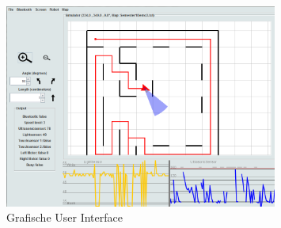 \documentclass[eind]{penoverslag}
\begin{document}
\begin{figure}[tbp]
\begin{center}
    \includegraphics[width=0.8\textwidth]{GUI}
    \caption{Grafische User Interface}
	\label{fig:gui}
\end{center}
\end{figure}
\end{document}
